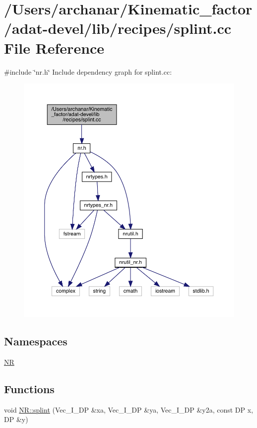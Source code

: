 \hypertarget{adat-devel_2lib_2recipes_2splint_8cc}{}\section{/\+Users/archanar/\+Kinematic\+\_\+factor/adat-\/devel/lib/recipes/splint.cc File Reference}
\label{adat-devel_2lib_2recipes_2splint_8cc}
{\ttfamily \#include \char`\"{}nr.\+h\char`\"{}}\newline
Include dependency graph for splint.\+cc\+:
\nopagebreak
\begin{figure}[H]
\begin{center}
\leavevmode
\includegraphics[width=350pt]{d8/d2c/adat-devel_2lib_2recipes_2splint_8cc__incl}
\end{center}
\end{figure}
\subsection*{Namespaces}
\begin{DoxyCompactItemize}
\item 
 \mbox{\hyperlink{namespaceNR}{NR}}
\end{DoxyCompactItemize}
\subsection*{Functions}
\begin{DoxyCompactItemize}
\item 
void \mbox{\hyperlink{namespaceNR_af17868718dea0cf57360a9a84b1bf76f}{N\+R\+::splint}} (Vec\+\_\+\+I\+\_\+\+DP \&xa, Vec\+\_\+\+I\+\_\+\+DP \&ya, Vec\+\_\+\+I\+\_\+\+DP \&y2a, const DP x, DP \&y)
\end{DoxyCompactItemize}
